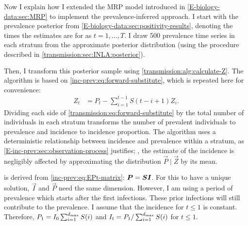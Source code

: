 \documentclass[thesis.tex]{subfiles}
\begin{document}
Now I explain how I extended the MRP model introduced in \cref{E-biology-data:sec:MRP} to implement the prevalence-inferred approach.
I start with the prevalence posterior from \cref{E-biology-data:sec:positivity-results}, denoting the times the estimates are for as $t = 1, \dots, T$.
I draw 500 prevalence time series in each stratum from the approximate posterior distribution (using the procedure described in \cref{transmission:sec:INLA:posterior}).

Then, I transform this posterior sample using \cref{transmission:alg:calculate-Z}.
The algorithm is based on \cref{inc-prev:eq:forward-substitute}, which is repeated here for convenience:
\begin{align}
Z_t
&= P_t - \sum_{i=1}^{t-1} S(t - i + 1) Z_i.
\label{transmission:eq:forward-substitute}
\end{align}
Dividing each side of \cref{transmission:eq:forward-substitute} by the total number of individuals in each stratum transforms the number of prevalent individuals to prevalence and incidence to incidence proportion.
The algorithm uses a deterministic relationship between incidence and prevalence within a stratum, as \cref{E-inc-prev:sec:observation-process} justifies; \ie, the estimate of the incidence is negligibly affected by approximating the distribution $\vec{P} \mid \vec{Z}$ by its mean.

\begin{algorithm}
    \caption{%
      Algorithm to transform 500 posterior samples posterior samples of $\vec{P}$ to posterior samples of $\vec{Z}$.
      Assumes constant incidence for $t \leq 1$ where $t = 1$ is the first day of prevalence data.
      Calculation of $Z^{(j)}_{i,t}$ is from \cref{transmission:eq:forward-substitute}.
    }
    \label{transmission:alg:calculate-Z}
\end{algorithm}

 is derived from \cref{inc-prev:eq:EPt-matrix}: $\bm{P} = \bm{S} \bm{I}$.
For this to have a unique solution, $\vec{I}$ and $\vec{P}$ need the same dimension.
However, I am using a period of prevalence which starts after the first infections.
These prior infections will still contribute to the prevalence.
I assume that the incidence for $t \leq 1$ is constant.
Therefore, $P_1 = I_0 \sum_{i=1}^{d_\text{max}} S(i)$ and $I_t = P_1 / \sum_{i=1}^{d_\text{max}} S(i)$ for $t \leq 1$.
\end{document}
